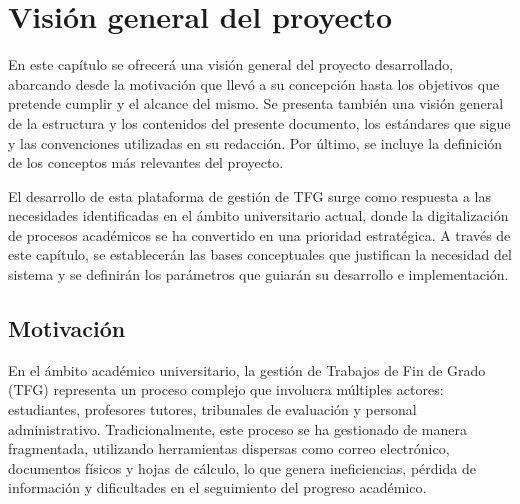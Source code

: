 \documentclass[12pt,a4paper,oneside]{report}
\begin{document}


\renewcommand{\contentsname}{Índice}
\tableofcontents
\newpage

\renewcommand{\listfigurename}{Lista de Figuras}
\listoffigures
\newpage

\markboth{}{}

\setcounter{chapter}{0}

\chapter{Visión general del
proyecto}\label{visiuxf3n-general-del-proyecto}

En este capítulo se ofrecerá una visión general del proyecto
desarrollado, abarcando desde la motivación que llevó a su concepción
hasta los objetivos que pretende cumplir y el alcance del mismo. Se
presenta también una visión general de la estructura y los contenidos
del presente documento, los estándares que sigue y las convenciones
utilizadas en su redacción. Por último, se incluye la definición de los
conceptos más relevantes del proyecto.

El desarrollo de esta plataforma de gestión de TFG surge como respuesta
a las necesidades identificadas en el ámbito universitario actual, donde
la digitalización de procesos académicos se ha convertido en una
prioridad estratégica. A través de este capítulo, se establecerán las
bases conceptuales que justifican la necesidad del sistema y se
definirán los parámetros que guiarán su desarrollo e implementación.

\section{Motivación}\label{motivaciuxf3n}

En el ámbito académico universitario, la gestión de Trabajos de Fin de
Grado (TFG) representa un proceso complejo que involucra múltiples
actores: estudiantes, profesores tutores, tribunales de evaluación y
personal administrativo. Tradicionalmente, este proceso se ha gestionado
de manera fragmentada, utilizando herramientas dispersas como correo
electrónico, documentos físicos y hojas de cálculo, lo que genera
ineficiencias, pérdida de información y dificultades en el seguimiento
del progreso académico.
\end{document}
